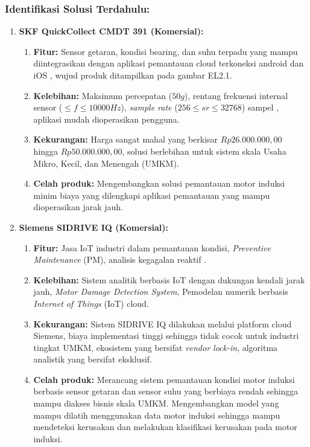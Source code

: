 \documentclass{elsinta}
\begin{document}
\subsubsection*{Identifikasi Solusi Terdahulu:}
\begin{enumerate}
    \item \textbf{SKF QuickCollect CMDT 391 (Komersial):}
    \begin{enumerate}
        \item \textbf{Fitur:} Sensor getaran, kondisi bearing, dan suhu terpadu yang mampu diintegrasikan dengan aplikasi pemantauan cloud terkoneksi android dan iOS \cite{SKFGroup2021}, wujud produk ditampilkan pada gambar EL2.1.
        \item \textbf{Kelebihan:} Maksimum percepatan ($50g$), rentang frekuensi internal sensor ($\leq f \leq 10000Hz$), \textit{sample rate} ($256\leq sr \leq 32768$) sampel \cite{SKFGroup2025}, aplikasi mudah dioperasikan pengguna.
        \item \textbf{Kekurangan:} Harga sangat mahal yang berkisar $Rp26.000.000,00$ hingga $Rp50.000.000,00$, solusi berlebihan untuk sistem skala Usaha Mikro, Kecil, dan Menengah (UMKM).
        \item \textbf{Celah produk:} Mengembangkan solusi pemantauan motor induksi minim biaya yang dilengkapi aplikasi pemantauan yang mampu dioperasikan jarak jauh.
    \end{enumerate}
    \item \textbf{Siemens SIDRIVE IQ (Komersial):}
    \begin{enumerate}
        \item \textbf{Fitur:} Jasa IoT industri dalam pemantauan kondisi, \textit{Preventive Maintenance} (PM), analisis kegagalan reaktif \cite{SiemensAG2023}.
        \item \textbf{Kelebihan:} Sistem analitik berbasis IoT dengan dukungan kendali jarak jauh, \textit{Motor Damage Detection System}, Pemodelan numerik berbasis \textit{Internet of Things} (IoT) cloud\cite{SiemensAG2023}.
        \item \textbf{Kekurangan:} Sistem SIDRIVE IQ dilakukan melalui platform cloud Siemens, biaya implementasi tinggi sehingga tidak cocok untuk industri tingkat UMKM, ekosistem yang bersifat \textit{vendor lock-in}, algoritma analistik yang bersifat eksklusif.
        \item \textbf{Celah produk:} Merancang sistem pemantauan kondisi motor induksi berbasis sensor getaran dan sensor suhu yang berbiaya rendah sehingga mampu diakses bisnis skala UMKM. Mengembangkan model yang mampu dilatih menggunakan data motor induksi sehingga mampu mendeteksi kerusakan dan melakukan klasifikasi kerusakan pada motor induksi.
    \end{enumerate}
\end{enumerate}
 
\end{document}
